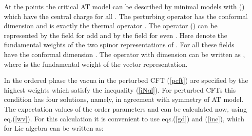 \documentclass[a4paper,12pt]{article}
\begin{document}
At the points \coordHE{} the critical AT model can be described by 
\coordHE{} minimal models 
with \coordHE{} (\coordHE{}) 
which  have the central charge \coordHE{} for all \coordHE{}. The
perturbing operator \coordHE{}  \coordHE{} has the
conformal dimension  \coordHE{} and is exactly the
thermal operator \myHighlight{$\varepsilon $}\coordHE{}. The operator \myHighlight{$\sigma $}\coordHE{} (\myHighlight{$\sigma ^{+}$}\coordHE{}) can
be represented by the field \coordHE{} for odd \coordHE{} and by the field \coordHE{} for even \coordHE{}. Here 
\coordHE{} denote the fundamental weights of the two spinor
representations of \coordHE{}. For all \coordHE{} these fields have the conformal
dimension \coordHE{}. The operator \myHighlight{$\Sigma $}\coordHE{} 
with dimension \coordHE{} can be written as 
\coordHE{}, where \coordHE{} is
the fundamental weight of the vector representation.

In the ordered phase the vacua \coordHE{} in the perturbed CFT (\ref{pcft}) are
specified by the highest weights \coordHE{} which satisfy the inequality
(\ref{iNql}). For perturbed  \coordHE{} CFTs this condition has
four solutions, namely, \coordHE{} in
agreement with \coordHE{} symmetry of AT model. The expectation values of the
order parameters \myHighlight{$\sigma $}\coordHE{} and \myHighlight{$\Sigma $}\coordHE{} can be calculated now, using
eq.(\ref{wv}). For this calculation it is convenient to use eqs.(\ref{gd}) and
(\ref{inc}), which for Lie algebra \coordHE{} can be written as:
\end{document}
